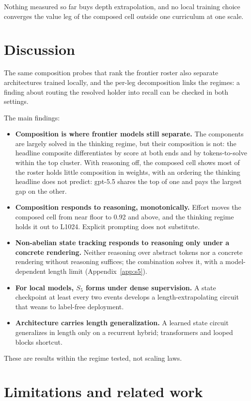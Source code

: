 \documentclass[11pt]{article}
\newcommand{\Sfive}{$S_5$}
\begin{document}
Nothing measured so far buys depth extrapolation, and no local training choice converges the
value leg of the composed cell outside one curriculum at one scale.

\section{Discussion}

The same composition probes that rank the frontier roster also separate architectures trained
locally, and the per-leg decomposition links the regimes: a finding about routing the resolved holder into recall can be checked in both
settings.

The main findings:

\begin{itemize}
\item \textbf{Composition is where frontier models still separate.} The components are largely
  solved in the thinking regime, but their composition is not: the headline composite
  differentiates by score at both ends and by tokens-to-solve within the top cluster. With
  reasoning off, the composed cell shows most of the roster holds little composition in
  weights, with an ordering the thinking headline does not predict: gpt-5.5 shares the top of
  one and pays the largest gap on the other.
\item \textbf{Composition responds to reasoning, monotonically.} Effort moves the composed
  cell from near floor to 0.92 and above, and the thinking regime holds it out to L1024.
  Explicit prompting does not substitute.
\item \textbf{Non-abelian state tracking responds to reasoning only under a concrete
  rendering.} Neither reasoning over abstract tokens nor a concrete rendering without
  reasoning suffices; the combination solves it, with a model-dependent length limit
  (Appendix~\ref{app:s5}).
\item \textbf{For local models, \Sfive{} forms under dense supervision.} A state checkpoint at
  least every two events develops a length-extrapolating circuit that weans to label-free
  deployment.
\item \textbf{Architecture carries length generalization.} A learned state circuit generalizes
  in length only on a recurrent hybrid; transformers and looped blocks shortcut.
\end{itemize}

These are results within the regime tested, not scaling laws.

\section{Limitations and related work}
\end{document}
